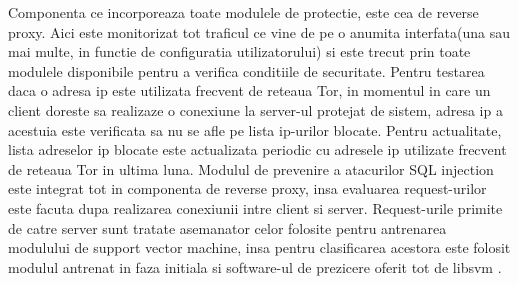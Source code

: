 Componenta ce incorporeaza toate modulele de protectie, este cea de reverse proxy. Aici este monitorizat tot traficul ce vine de pe o anumita interfata(una sau mai multe, in functie de configuratia utilizatorului) si este trecut prin toate modulele disponibile pentru a verifica conditiile de securitate. Pentru testarea daca o adresa ip este utilizata frecvent de reteaua Tor, in momentul in care un client doreste sa realizaze o conexiune la server-ul protejat de sistem, adresa ip a acestuia este verificata sa nu se afle pe lista ip-urilor blocate. Pentru actualitate, lista adreselor ip blocate este actualizata periodic cu adresele ip utilizate frecvent de reteaua Tor in ultima luna. Modulul de prevenire a atacurilor SQL injection este integrat tot in componenta de reverse proxy, insa evaluarea request-urilor este facuta dupa realizarea conexiunii intre client si server. Request-urile primite de catre server sunt tratate asemanator celor folosite pentru antrenarea modulului de support vector machine, insa pentru clasificarea acestora este folosit modulul antrenat in faza initiala si software-ul de prezicere oferit tot de libsvm \cite{libsvm}.
	
	

	





